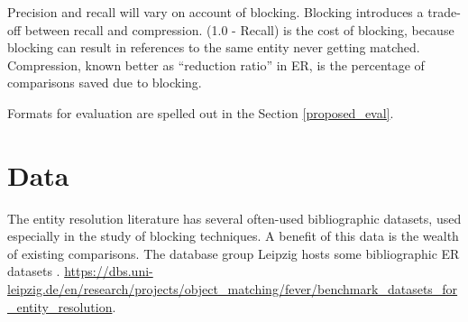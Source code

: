 \documentclass{article}
\begin{document}
Precision and recall will vary on account of blocking. Blocking introduces a trade-off between recall and compression. (1.0 - Recall) is the cost of blocking, because blocking can result in references to the same entity never getting matched. Compression, known better as ``reduction ratio'' in ER, is the percentage of comparisons saved due to blocking. 

Formats for evaluation are spelled out in the Section \ref{proposed_eval}.

\section{Data}

The entity resolution literature has several often-used bibliographic datasets, used especially in the study of blocking techniques. A benefit of this data is the wealth of existing comparisons. The database group Leipzig hosts some bibliographic ER datasets \cite{kopcke2010evaluation}. \url{https://dbs.uni-leipzig.de/en/research/projects/object_matching/fever/benchmark_datasets_for_entity_resolution}. 
\end{document}
